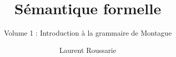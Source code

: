 \title{Sémantique formelle}  %
\subtitle{Volume 1 : Introduction à la grammaire de Montague}
\BackBody{%
}
\author{Laurent Roussarie}
\renewcommand{\lsISBNdigital}{978-3-96110-017-0} 
\renewcommand{\lsISBNsoftcover}{978-1-977891-54-9}
\renewcommand{\lsSeries}{tbls} %
\renewcommand{\lsSeriesNumber}{4} %
\renewcommand{\lsURL}{http://langsci-press.org/catalog/book/143} %
\renewcommand{\lsID}{143}

